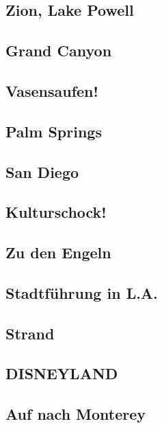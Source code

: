 \documentclass[twoside]{scrartcl}
\begin{document}
\subsection*{Zion, Lake Powell}


\subsection*{Grand Canyon}


\subsection*{Vasensaufen!}


\subsection*{Palm Springs}


\subsection*{San Diego}


\subsection*{Kulturschock!}


\subsection*{Zu den Engeln}


\subsection*{Stadtführung in L.A.}


\subsection*{Strand}


\subsection*{DISNEYLAND}


\subsection*{Auf nach Monterey}

\end{document}
